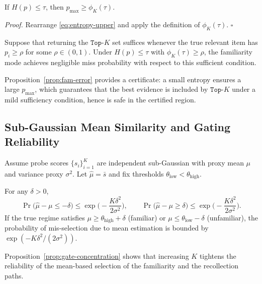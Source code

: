 \begin{lemma}
\label{lem:cert}
If $H(p)\le \tau$, then $p_{\max}\ge \phi_K(\tau)$.
\end{lemma}

\noindent\emph{Proof.}
Rearrange \eqref{eq:entropy-upper} and apply the definition of $\phi_K(\tau)$.
\hfill$\square$

\begin{proposition}
\label{prop:fam-error}
Suppose that returning the $\texttt{Top-}K$ set suffices whenever the true relevant item has $p_i\ge \rho$ for some $\rho\in(0,1)$.
Under $H(p)\le \tau$ with $\phi_K(\tau)\ge \rho$, the familiarity mode achieves negligible miss probability with respect to this sufficient condition.
\end{proposition}

\noindent Proposition~\ref{prop:fam-error} provides a certificate: a small entropy ensures a large $p_{\max}$, which guarantees that the best evidence is included by $\texttt{Top-}K$ under a mild sufficiency condition, hence  is safe in the certified region.

\subsection{Sub-Gaussian Mean Similarity and Gating Reliability}
\label{app:sub_gaus}
Assume probe scores $\{s_i\}_{i=1}^K$ are independent sub-Gaussian with proxy mean $\mu$ and variance proxy $\sigma^2$.
Let $\widehat{\mu}=\bar{s}$ and fix thresholds $\theta_{\text{low}}<\theta_{\text{high}}$.

\begin{proposition}
\label{prop:gate-concentration}
For any $\delta>0$,
\begin{equation}
\Pr\big(\widehat{\mu}-\mu\le -\delta\big)\le \exp\!\Big(-\frac{K\delta^2}{2\sigma^2}\Big), \qquad
\Pr\big(\widehat{\mu}-\mu\ge \delta\big)\le \exp\!\Big(-\frac{K\delta^2}{2\sigma^2}\Big).
\end{equation}
If the true regime satisfies $\mu\ge \theta_{\text{high}}+\delta$ (familiar) or $\mu\le \theta_{\text{low}}-\delta$ (unfamiliar), the probability of mis-selection due to mean estimation is bounded by $\exp(-K\delta^2/(2\sigma^2))$.
\end{proposition}

\noindent Proposition~\ref{prop:gate-concentration} shows that increasing $K$ tightens the reliability of the mean-based selection of the familiarity and the recollection paths.

